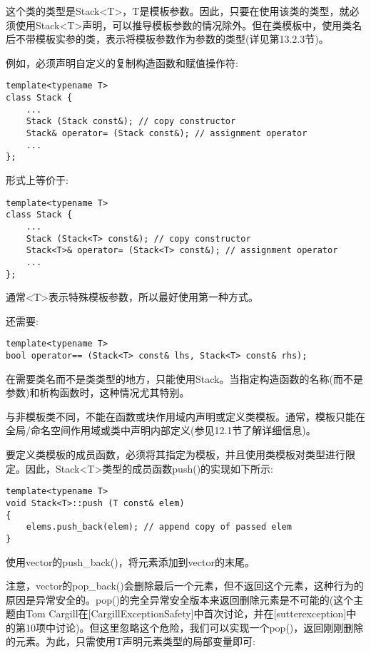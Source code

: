 这个类的类型是Stack<T>，T是模板参数。因此，只要在使用该类的类型，就必须使用Stack<T>声明，可以推导模板参数的情况除外。但在类模板中，使用类名后不带模板实参的类，表示将模板参数作为参数的类型(详见第13.2.3节)。

例如，必须声明自定义的复制构造函数和赋值操作符:

\begin{lstlisting}[style=styleCXX]
template<typename T>
class Stack {
	...
	Stack (Stack const&); // copy constructor
	Stack& operator= (Stack const&); // assignment operator
	...
};
\end{lstlisting}

形式上等价于:

\begin{lstlisting}[style=styleCXX]
template<typename T>
class Stack {
	...
	Stack (Stack<T> const&); // copy constructor
	Stack<T>& operator= (Stack<T> const&); // assignment operator
	...
};
\end{lstlisting}

通常<T>表示特殊模板参数，所以最好使用第一种方式。

还需要:

\begin{lstlisting}[style=styleCXX]
template<typename T>
bool operator== (Stack<T> const& lhs, Stack<T> const& rhs);
\end{lstlisting}

在需要类名而不是类类型的地方，只能使用Stack。当指定构造函数的名称(而不是参数)和析构函数时，这种情况尤其特别。

与非模板类不同，不能在函数或块作用域内声明或定义类模板。通常，模板只能在全局/命名空间作用域或类中声明内部定义(参见12.1节了解详细信息)。


要定义类模板的成员函数，必须将其指定为模板，并且使用类模板对类型进行限定。因此，Stack<T>类型的成员函数push()的实现如下所示:

\begin{lstlisting}[style=styleCXX]
template<typename T>
void Stack<T>::push (T const& elem)
{
	elems.push_back(elem); // append copy of passed elem
}
\end{lstlisting}

使用vector的push\_back()，将元素添加到vector的末尾。

注意，vector的pop\_back()会删除最后一个元素，但不返回这个元素，这种行为的原因是异常安全的。pop()的完全异常安全版本来返回删除元素是不可能的(这个主题由Tom Cargill在[CargillExceptionSafety]中首次讨论，并在[sutterexception]中的第10项中讨论)。但这里忽略这个危险，我们可以实现一个pop()，返回刚刚删除的元素。为此，只需使用T声明元素类型的局部变量即可:

